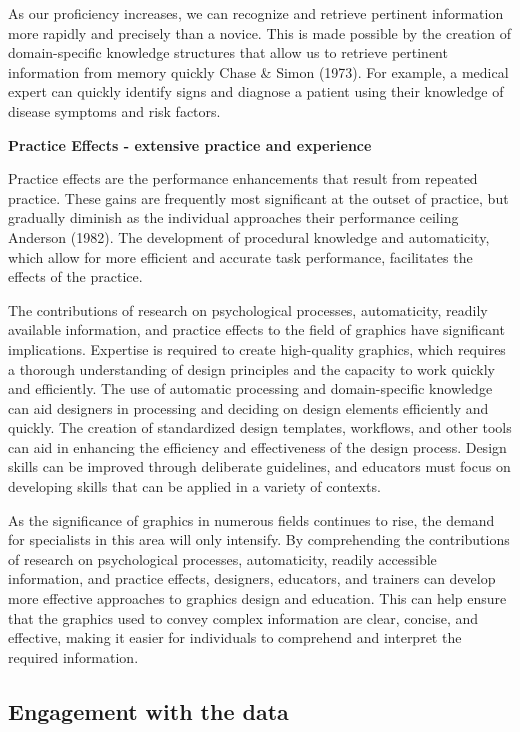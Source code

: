 \documentclass[print]{nuthesis}
\begin{document}
As our proficiency increases, we can recognize and retrieve pertinent information more rapidly and precisely than a novice.
This is made possible by the creation of domain-specific knowledge structures that allow us to retrieve pertinent information from memory quickly Chase \& Simon (1973).
For example, a medical expert can quickly identify signs and diagnose a patient using their knowledge of disease symptoms and risk factors.

\textbf{Practice Effects - extensive practice and experience}

Practice effects are the performance enhancements that result from repeated practice.
These gains are frequently most significant at the outset of practice, but gradually diminish as the individual approaches their performance ceiling Anderson (1982).
The development of procedural knowledge and automaticity, which allow for more efficient and accurate task performance, facilitates the effects of the practice.

The contributions of research on psychological processes, automaticity, readily available information, and practice effects to the field of graphics have significant implications.
Expertise is required to create high-quality graphics, which requires a thorough understanding of design principles and the capacity to work quickly and efficiently.
The use of automatic processing and domain-specific knowledge can aid designers in processing and deciding on design elements efficiently and quickly.
The creation of standardized design templates, workflows, and other tools can aid in enhancing the efficiency and effectiveness of the design process.
Design skills can be improved through deliberate guidelines, and educators must focus on developing skills that can be applied in a variety of contexts.

As the significance of graphics in numerous fields continues to rise, the demand for specialists in this area will only intensify.
By comprehending the contributions of research on psychological processes, automaticity, readily accessible information, and practice effects, designers, educators, and trainers can develop more effective approaches to graphics design and education.
This can help ensure that the graphics used to convey complex information are clear, concise, and effective, making it easier for individuals to comprehend and interpret the required information.

\hypertarget{engagement-with-the-data}{%
\subsection{Engagement with the data}\label{engagement-with-the-data}}
\end{document}
